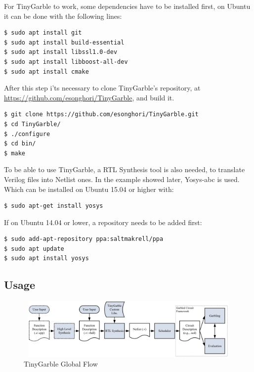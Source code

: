 \begin{refsection}
For TinyGarble to work, some dependencies have to be installed first, on Ubuntu it can be done with the following lines:

\begin{lstlisting}[caption={Installation of TinyGarble's dependencies}, language=bash, captionpos=b]
$ sudo apt install git
$ sudo apt install build-essential
$ sudo apt install libssl1.0-dev
$ sudo apt install libboost-all-dev
$ sudo apt install cmake
\end{lstlisting}

After this step i'ts necessary to clone TinyGarble's repository, at \url{https://github.com/esonghori/TinyGarble}, and build it.

\begin{lstlisting}[caption={Configuration and compilation of TinyGarble}, language=bash, captionpos=b]
$ git clone https://github.com/esonghori/TinyGarble.git
$ cd TinyGarble/
$ ./configure
$ cd bin/
$ make
\end{lstlisting}

To be able to use TinyGarble, a RTL Synthesis tool is also needed, to translate Verilog files into Netlist ones. In the example showed later, Yosys-abc is used. Which can be installed on Ubuntu 15.04 or higher with:

\begin{lstlisting}[caption={Installation of Yosys-abc for Ubuntu 15.04>}, language=bash, captionpos=b]
$ sudo apt-get install yosys
\end{lstlisting}

If on Ubuntu 14.04 or lower, a repository needs to be added first:

\begin{lstlisting}[caption={Installation of Yosys-abc for Ubuntu 14.04<}, language=bash, captionpos=b]
$ sudo add-apt-repository ppa:saltmakrell/ppa
$ sudo apt update
$ sudo apt install yosys
\end{lstlisting}

\newpage

\subsection{Usage}

\begin{figure}[H]
	\centering
	\includegraphics[width=1\textwidth, height=3cm]{./sdf/secure_multiparty_computation/figures/tiny_garble_flow.png}
    \caption{TinyGarble Global Flow\cite{Songhori}}\label{fig:tinygarble_flow}
\end{figure}


\end{refsection}

